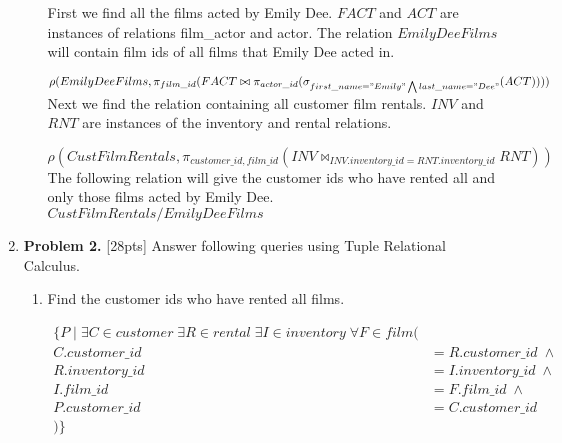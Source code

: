 \documentclass[paper=a4, fontsize=11pt]{scrartcl} %
\numberwithin{figure}{section} %
\numberwithin{table}{section} %
\begin{document}
\begin{enumerate}
\begin{enumerate}
First we find all the films acted by Emily Dee. $FACT$ and $ACT$ are instances of relations film_actor and actor. The relation $EmilyDeeFilms$ will contain film ids of all films that Emily Dee acted in.

$\rho(EmilyDeeFilms, \pi_{film\_id}(FACT \bowtie \pi_{actor\_id}(\sigma_{first\_name = "Emily" \bigwedge last\_name = "Dee"} (ACT))))$\\

Next we find the relation containing all customer film rentals. $INV$ and $RNT$ are instances of the inventory and rental relations.

$\rho(CustFilmRentals, \pi_{customer\_id, film\_id} (INV \bowtie_{INV.inventory\_id = RNT.inventory\_id} RNT))$\\

The following relation will give the customer ids who have rented all and only those films acted by Emily Dee.\\

$CustFilmRentals / EmilyDeeFilms$
\end{enumerate}

\item \textbf{Problem 2.} [28pts] Answer following queries using Tuple Relational Calculus.

\begin{enumerate}

\item Find the customer ids who have rented all films.

\begin{equation*}
\begin{aligned}
 \{ P \; | \; \exists C \in customer \; \exists R \in rental \; \exists I \in inventory \; \forall F \in film (\\
 C.customer\_id &= R.customer\_id \; \wedge \\
 R.inventory\_id &= I.inventory\_id \; \wedge \\
 I.film\_id &= F.film\_id \; \wedge  \\
 P.customer\_id &= C.customer\_id\\
 )  \}
\end{aligned}
\end{equation*}


\end{enumerate}
\end{enumerate}
\end{document}
